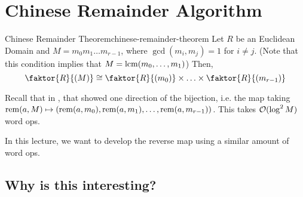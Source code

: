 
\section{Chinese Remainder Algorithm}

\begin{theorem}{Chinese Remainder Theorem}{chinese-remainder-theorem}
    Let $R$ be an Euclidean Domain and $M = m_0m_1 \ldots m_{r-1}$, where $\gcd(m_i, m_j) = 1$ for $i \neq j$.
    (Note that this condition implies that $M = \operatorname{lcm}(m_0, \ldots, m_1)$)
    Then,
    \begin{equation}
        \faktor{R}{(M)} \cong \faktor{R}{(m_0)} \times \ldots \times \faktor{R}{(m_{r-1})}
    \end{equation}
\end{theorem}

Recall that in ,  that showed one direction of the bijection, i.e. the map taking $\operatorname{rem}(a, M) \mapsto \left(\operatorname{rem}(a, m_0), \operatorname{rem}(a, m_1), \ldots, \operatorname{rem}(a, m_{r-1})\right)$.
This takes $\operatorname{\mathcal{O}}(\log^2 M)$ word ops.

In this lecture, we want to develop the reverse map using a similar amount of word ops.

\subsection{Why is this interesting?}
